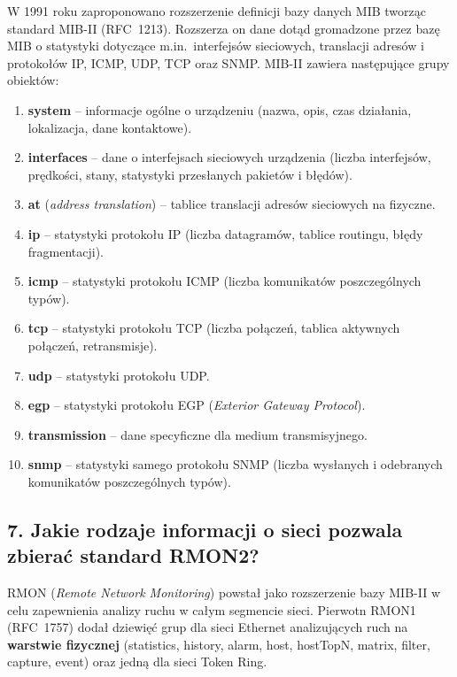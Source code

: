 \documentclass[12pt,a4paper]{article}
\begin{document}
W 1991 roku zaproponowano rozszerzenie definicji bazy danych MIB tworząc
standard MIB-II (RFC~1213). Rozszerza on dane dotąd gromadzone przez bazę MIB
o statystyki dotyczące m.in.\ interfejsów sieciowych, translacji adresów
i protokołów IP, ICMP, UDP, TCP oraz SNMP. MIB-II zawiera następujące grupy
obiektów:

\begin{enumerate}
  \item \textbf{system} -- informacje ogólne o urządzeniu (nazwa, opis,
        czas działania, lokalizacja, dane kontaktowe).
  \item \textbf{interfaces} -- dane o interfejsach sieciowych urządzenia
        (liczba interfejsów, prędkości, stany, statystyki przesłanych pakietów
        i błędów).
  \item \textbf{at} (\emph{address translation}) -- tablice translacji adresów
        sieciowych na fizyczne.
  \item \textbf{ip} -- statystyki protokołu IP (liczba datagramów, tablice
        routingu, błędy fragmentacji).
  \item \textbf{icmp} -- statystyki protokołu ICMP (liczba komunikatów
        poszczególnych typów).
  \item \textbf{tcp} -- statystyki protokołu TCP (liczba połączeń, tablica
        aktywnych połączeń, retransmisje).
  \item \textbf{udp} -- statystyki protokołu UDP.
  \item \textbf{egp} -- statystyki protokołu EGP (\emph{Exterior Gateway Protocol}).
  \item \textbf{transmission} -- dane specyficzne dla medium transmisyjnego.
  \item \textbf{snmp} -- statystyki samego protokołu SNMP (liczba wysłanych
        i odebranych komunikatów poszczególnych typów).
\end{enumerate}

\subsection*{7. Jakie rodzaje informacji o sieci pozwala zbierać standard RMON2?}

RMON (\emph{Remote Network Monitoring}) powstał jako rozszerzenie bazy MIB-II
w celu zapewnienia analizy ruchu w całym segmencie sieci. Pierwotn RMON1
(RFC~1757) dodał dziewięć grup dla sieci Ethernet analizujących ruch na
\textbf{warstwie fizycznej} (statistics, history, alarm, host, hostTopN, matrix,
filter, capture, event) oraz jedną dla sieci Token Ring.
\end{document}
